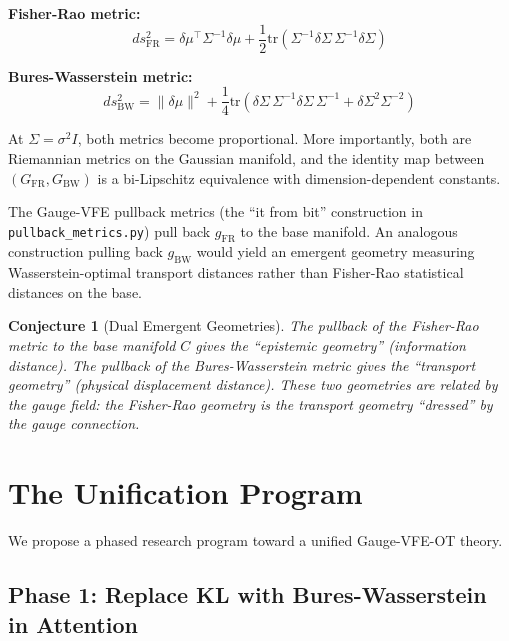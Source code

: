 \documentclass[11pt]{article}
\newtheorem{conjecture}{Conjecture}
\newcommand{\tr}{\mathrm{tr}}
\begin{document}
\textbf{Fisher-Rao metric:}
\begin{equation}
ds_{\text{FR}}^2 = \delta\mu^\top \Sigma^{-1} \delta\mu + \frac{1}{2}\tr(\Sigma^{-1}\delta\Sigma\,\Sigma^{-1}\delta\Sigma)
\end{equation}

\textbf{Bures-Wasserstein metric:}
\begin{equation}
ds_{\text{BW}}^2 = \|\delta\mu\|^2 + \frac{1}{4}\tr\!\left(\delta\Sigma\,\Sigma^{-1}\delta\Sigma\,\Sigma^{-1} + \delta\Sigma^2\Sigma^{-2}\right)
\end{equation}

At $\Sigma = \sigma^2 I$, both metrics become proportional. More importantly, both are Riemannian metrics on the Gaussian manifold, and the identity map between $(G_{\text{FR}}, G_{\text{BW}})$ is a bi-Lipschitz equivalence with dimension-dependent constants.

The Gauge-VFE pullback metrics (the ``it from bit'' construction in \texttt{pullback\_metrics.py}) pull back $g_{\text{FR}}$ to the base manifold. An analogous construction pulling back $g_{\text{BW}}$ would yield an emergent geometry measuring Wasserstein-optimal transport distances rather than Fisher-Rao statistical distances on the base.

\begin{conjecture}[Dual Emergent Geometries]
The pullback of the Fisher-Rao metric to the base manifold $C$ gives the ``epistemic geometry'' (information distance). The pullback of the Bures-Wasserstein metric gives the ``transport geometry'' (physical displacement distance). These two geometries are related by the gauge field: the Fisher-Rao geometry is the transport geometry ``dressed'' by the gauge connection.
\end{conjecture}


\section{The Unification Program}

We propose a phased research program toward a unified Gauge-VFE-OT theory.

\subsection{Phase 1: Replace KL with Bures-Wasserstein in Attention}
\end{document}
